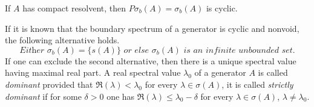 \begin{corollary}\label{cor:b3-2.10}
If\/ $A$ has compact resolvent, then $P\sigma_{b}(A) = \sigma_{b}(A)$ is cyclic.
\end{corollary}
If it is known that the boundary spectrum of a generator is cyclic and nonvoid, the following alternative holds.
\begin{equation}\label{eq:b3-2.19}
\textit{Either $\sigma_{b}(A) = \{ s(A) \} $ or else  $\sigma_{b}(A)$ is an infinite unbounded set.}
\end{equation}
If one can exclude the second alternative, then there is a unique spectral value having maximal real part.
A real spectral value $\lambda_{0}$ of a generator $A$ is called \emph{dominant}
provided that $\Re(\lambda) < \lambda_{0}$ for every $\lambda \in \sigma(A)$, it is called \emph{strictly dominant}
if for some $\delta > 0$ one has $\Re(\lambda) \leq \lambda_{0} - \delta$ for every $\lambda \in \sigma(A)$, $\lambda \neq \lambda_{0}$.

